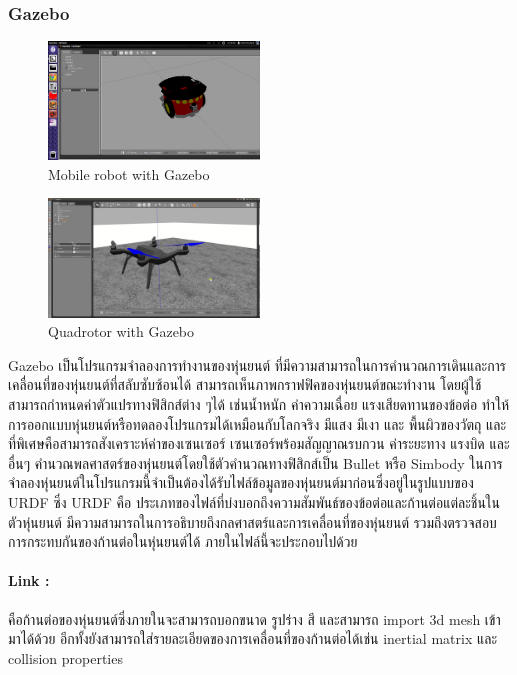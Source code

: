 \subsubsection*{Gazebo}
\begin{figure}[!ht]
    \centering
    \includegraphics[width=0.5\textwidth]{chapter2/images/sim_gazebo1.png}
    \caption{Mobile robot with Gazebo}
    \label{fig:sim_gazebo1}
\end{figure}
\begin{figure}[!ht]
    \centering
    \includegraphics[width=0.5\textwidth]{chapter2/images/sim_gazebo2.jpg}
    \caption{Quadrotor with Gazebo}
    \label{fig:sim_gazebo2}
\end{figure}
Gazebo เป็นโปรแกรมจำลองการทำงานของหุ่นยนต์ ที่มีความสามารถในการคำนวณการเดินและการเคลื่อนที่ของหุ่นยนต์ที่สลับซับซ้อนได้
สามารถเห็นภาพกราฟฟิคของหุ่นยนต์ขณะทำงาน โดยผู้ใช้สามารถกำหนดค่าตัวแปรทางฟิสิกส์ต่าง ๆได้ เช่นน้ำหนัก ค่าความเฉื่อย แรงเสียดทานของข้อต่อ
ทำให้การออกแบบหุ่นยนต์หรือทดลองโปรแกรมได้เหมือนกับโลกจริง มีแสง มีเงา และ พื้นผิวของวัตถุ และที่พิเศษคือสามารถสังเคราะห์ค่าของเซนเซอร์
เซนเซอร์พร้อมสัญญาณรบกวน ค่าระยะทาง แรงบิด และอื่นๆ คำนวณพลศาสตร์ของหุ่นยนต์โดยใช้ตัวคำนวณทางฟิสิกส์เป็น Bullet หรือ Simbody
ในการจำลองหุ่นยนต์ในโปรแกรมนี้จำเป็นต้องได้รับไฟล์ข้อมูลของหุ่นยนต์มาก่อนซึ่งอยู่ในรูปแบบของ URDF ซึ่ง URDF คือ
ประเภทของไฟล์ที่บ่งบอกถึงความสัมพันธ์ของข้อต่อและก้านต่อแต่ละชิ้นในตัวหุ่นยนต์ มีความสามารถในการอธิบายถึงกลศาสตร์และการเคลื่อนที่ของหุ่นยนต์
รวมถึงตรวจสอบการกระทบกันของก้านต่อในหุ่นยนต์ได้ ภายในไฟล์นี้จะประกอบไปด้วย

\paragraph*{Link :}
คือก้านต่อของหุ่นยนต์ซึ่งภายในจะสามารถบอกขนาด รูปร่าง สี และสามารถ import 3d mesh เข้ามาได้ด้วย
อีกทั้งยังสามารถใส่รายละเอียดของการเคลื่อนที่ของก้านต่อได้เช่น inertial matrix และ collision properties

